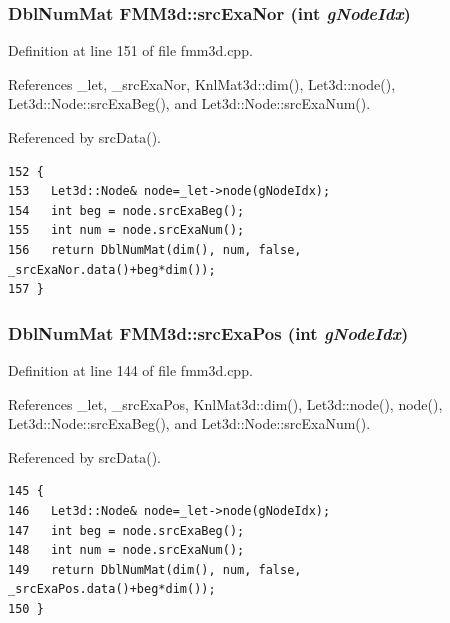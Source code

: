 \subsubsection{\setlength{\rightskip}{0pt plus 5cm}Dbl\-Num\-Mat FMM3d::src\-Exa\-Nor (int {\em g\-Node\-Idx})\hspace{0.3cm}{\tt  [protected]}}\label{classFMM3d_5cc0cd85a225581b4956a7f964bfc012_5cc0cd85a225581b4956a7f964bfc012}




Definition at line 151 of file fmm3d.cpp.

References \_\-let, \_\-src\-Exa\-Nor, Knl\-Mat3d::dim(), Let3d::node(), Let3d::Node::src\-Exa\-Beg(), and Let3d::Node::src\-Exa\-Num().

Referenced by src\-Data().

\footnotesize\begin{verbatim}152 {
153   Let3d::Node& node=_let->node(gNodeIdx);
154   int beg = node.srcExaBeg();
155   int num = node.srcExaNum();
156   return DblNumMat(dim(), num, false, _srcExaNor.data()+beg*dim());
157 }
\end{verbatim}\normalsize 


\subsubsection{\setlength{\rightskip}{0pt plus 5cm}Dbl\-Num\-Mat FMM3d::src\-Exa\-Pos (int {\em g\-Node\-Idx})\hspace{0.3cm}{\tt  [protected]}}\label{classFMM3d_9bf85c654c35501f98154dde68363e82_9bf85c654c35501f98154dde68363e82}




Definition at line 144 of file fmm3d.cpp.

References \_\-let, \_\-src\-Exa\-Pos, Knl\-Mat3d::dim(), Let3d::node(), node(), Let3d::Node::src\-Exa\-Beg(), and Let3d::Node::src\-Exa\-Num().

Referenced by src\-Data().

\footnotesize\begin{verbatim}145 {
146   Let3d::Node& node=_let->node(gNodeIdx);
147   int beg = node.srcExaBeg();
148   int num = node.srcExaNum();
149   return DblNumMat(dim(), num, false, _srcExaPos.data()+beg*dim());
150 }
\end{verbatim}\normalsize 


